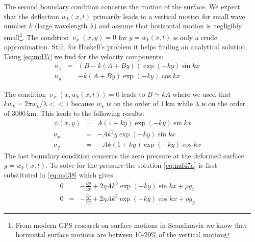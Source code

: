 The second boundary condition concerns the motion of the surface. We expect that the
deflection $w_k(x,t)$ primarily leads to a vertical motion for small wave number $k$
(large wavelength $\lambda$) and assume that horizontal motion is negligibly small\footnote{From modern
GPS research on surface motions in Scandinavia we know that horizontal surface motions
are between 10-20\% of the vertical motion}. 
The condition $\upnu_x(x,y)=0$ for $y=w_k(x,t)$
is only a crude approximation. Still, for Haskell’s problem it helps finding an
analytical solution. Using \eqref{eq:md37} we find for the velocity components:
\begin{eqnarray}
\upnu_x &=& (B-k(A+By)) \exp (-ky) \sin kx \label{eq:md46a} \\
\upnu_y &=& -k(A+By) \exp (-ky) \cos kx \label{eq:md46b} 
\end{eqnarray}

\vspace{0.5cm}
\vspace{0.5cm}

The condition $\upnu_x(x,w_k(x,t))=0$ leads to $B\simeq kA$ where we used that
$k w_k = 2\pi w_k/\lambda <<1$ because $w_k$ is on the order of $1~\si{\km}$ 
while $\lambda$ is on the order of $3000~\si{\km}$.
This leads to the following results:
\begin{eqnarray}
\psi(x,y) &=& A(1+ky)\exp (-ky) \sin kx \label{eq:md47a}\\
\upnu_x &=& -A k^2 y \exp (-ky) \sin kx \\
\upnu_y &=& -Ak(1+ky) \exp(-ky) \cos kx \label{eq:md47}
\end{eqnarray}
The last boundary condition concerns the zero pressure at the deformed surface 
$y=w_k(x,t)$.
To solve for the pressure the solution \eqref{eq:md47a} is 
first substituted in \eqref{eq:md38} which gives
\begin{eqnarray}
0 &=& -\frac{\partial p}{\partial x} + 2\eta A k^3 \exp (-ky) \sin kx + \rho g_x 
\label{eq:md48a}
\\
0 &=& -\frac{\partial p}{\partial y} + 2\eta A k^3 \exp (-ky) \cos kx + \rho g_y 
\label{eq:md48b}
\end{eqnarray}

\vspace{0.5cm}
\vspace{0.5cm}

